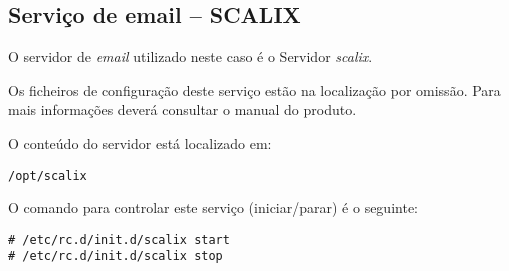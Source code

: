 \subsection{Serviço de email -- SCALIX}

O servidor de \emph{email} utilizado neste caso é o Servidor \emph{scalix}.

Os ficheiros de configuração deste serviço estão na localização por omissão. Para mais informações deverá consultar o manual do produto.

O conteúdo do servidor está localizado em:

\begin{Verbatim}[commandchars=\\\{\}]
/opt/scalix
\end{Verbatim}

O comando para controlar este serviço (iniciar/parar) é o seguinte:

\begin{Verbatim}[commandchars=\\\{\}]
# /etc/rc.d/init.d/scalix start
# /etc/rc.d/init.d/scalix stop
\end{Verbatim}

